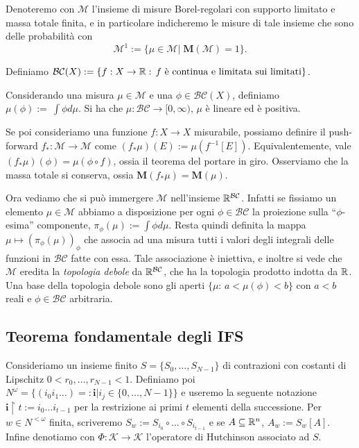 \begin{definizione}
	Denoteremo con $\mathcal M$ l'insieme di misure Borel-regolari con supporto limitato e massa totale finita, e in particolare indicheremo le misure di tale insieme che sono delle probabilità con 
	$$\mathcal M^{1} := \{\mu\in\mathcal M|\;\mathbf{M}(\mathcal M) = 1\}.$$
\end{definizione}
\begin{definizione}
	Definiamo $\mathcal{BC}(X) := \{f:X\to\mathbb{R}:\, f\text{ è continua e limitata sui limitati}\}$. 
\end{definizione}
	Considerando una misura $\mu\in\mathcal M$ e una $\phi\in\mathcal{BC}(X)$, definiamo $\mu(\phi):=~\int\phi d\mu$.
Si ha che $\mu:\mathcal{BC}\to[0,\infty)$, $\mu$ è lineare ed è positiva. 

Se poi consideriamo una funzione $f:X\to X$ misurabile, possiamo definire il push-forward $f_{*}:\mathcal M\to\mathcal M$ come $(f_{*}\mu)(E):=\mu(f^{-1}[E])$. Equivalentemente, vale $(f_{*}\mu)(\phi) = \mu(\phi\circ f)$, ossia il teorema del portare in giro. Osserviamo che la massa totale si conserva, ossia $\mathbf{M}(f_{*}\mu) = \mathbf{M}(\mu)$.

	Ora vediamo che si può immergere $\mathcal M$ nell'insieme $\mathbb{R}^{\mathcal{BC}}$. Infatti se fissiamo un elemento $\mu\in\mathcal M$ abbiamo a disposizione per ogni $\phi\in\mathcal {BC}$ la proiezione sulla ``$\phi$-esima'' componente, $\pi_{\phi}(\mu):= \int\phi d\mu$. Resta quindi definita la mappa $\mu\mapsto(\pi_{\phi}(\mu))_{\phi}$ che associa ad una misura tutti i valori degli integrali delle funzioni in $\mathcal{BC}$ fatte con essa. 
Tale associazione è iniettiva, e inoltre si vede che $\mathcal M$ eredita la \emph{topologia debole} da $\mathbb{R}^{\mathcal{BC}}$, che ha la topologia prodotto indotta da $\mathbb{R}$.
Una base della topologia debole sono gli aperti $\{\mu:\,a<\mu(\phi)<b\}$ con $a<b$ reali e $\phi\in\mathcal{BC}$ arbitraria.

\subsection{Teorema fondamentale degli IFS}

Consideriamo un insieme finito $S = \{S_{0},\dots,S_{N-1}\}$ di contrazioni con costanti di Lipschitz $0<r_{0},\dots,r_{N-1}<1$. 
Definiamo poi $N^{\omega} = \{(i_{0}i_{1}\dots) =: \mathbf i |i_{j}\in \{0,\dots,N-1\}\}$ e useremo la seguente notazione $\mathbf i\upharpoonright t:=i_{0}\dots i_{t-1}$ per la restrizione ai primi $t$ elementi della successione. 
Per $w\in N^{<\omega}$ finita, scriveremo $S_{w}:=S_{i_{0}}\circ \dots \circ S_{i_{t-1}}$ e se $A\subseteq\mathbb{R}^{n}$, $A_{w}:=S_{w}[A]$.
Infine denotiamo con $\Phi:\mathcal K\to\mathcal K$ l'operatore di Hutchinson associato ad $S$.

